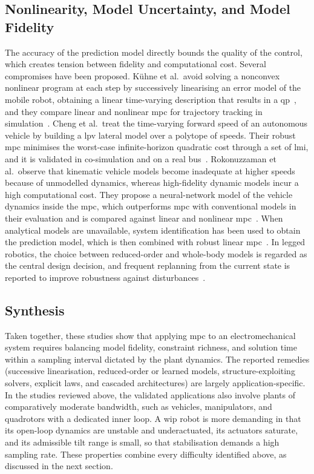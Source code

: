 \subsection{Nonlinearity, Model Uncertainty, and Model Fidelity}\label{sec:bg-apps-nonlinear}

The accuracy of the prediction model directly bounds the quality of the control, which creates tension between fidelity and computational cost. Several compromises have been proposed. K\"uhne et al.\ avoid solving a nonconvex nonlinear program at each step by successively linearising an error model of the mobile robot, obtaining a linear time-varying description that results in a \ac{qp}~\cite{kuhne2004}, and they compare linear and nonlinear \ac{mpc} for trajectory tracking in simulation~\cite{kuhne2005}. Cheng et al.\ treat the time-varying forward speed of an autonomous vehicle by building a \ac{lpv} lateral model over a polytope of speeds. Their robust \ac{mpc} minimises the worst-case infinite-horizon quadratic cost through a set of \ac{lmi}, and it is validated in co-simulation and on a real bus~\cite{cheng2021}. Rokonuzzaman et al.\ observe that kinematic vehicle models become inadequate at higher speeds because of unmodelled dynamics, whereas high-fidelity dynamic models incur a high computational cost. They propose a neural-network model of the vehicle dynamics inside the \ac{mpc}, which outperforms \ac{mpc} with conventional models in their evaluation and is compared against linear and nonlinear \ac{mpc}~\cite{rokonuzzaman2021}. When analytical models are unavailable, system identification has been used to obtain the prediction model, which is then combined with robust linear \ac{mpc}~\cite{kamel2017}. In legged robotics, the choice between reduced-order and whole-body models is regarded as the central design decision, and frequent replanning from the current state is reported to improve robustness against disturbances~\cite{katayama2023}.

\subsection{Synthesis}

Taken together, these studies show that applying \ac{mpc} to an electromechanical system requires balancing model fidelity, constraint richness, and solution time within a sampling interval dictated by the plant dynamics. The reported remedies (successive linearisation, reduced-order or learned models, structure-exploiting solvers, explicit laws, and cascaded architectures) are largely application-specific. In the studies reviewed above, the validated applications also involve plants of comparatively moderate bandwidth, such as vehicles, manipulators, and quadrotors with a dedicated inner loop. A \ac{wip} robot is more demanding in that its open-loop dynamics are unstable and underactuated, its actuators saturate, and its admissible tilt range is small, so that stabilisation demands a high sampling rate. These properties combine every difficulty identified above, as discussed in the next section.

